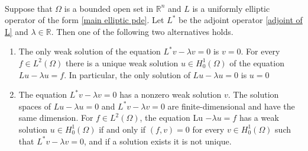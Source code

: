 \documentclass[11pt]{article}
\begin{document}
            \begin{thm}\phantom{k}\\
                Suppose that \(\Omega\) is a bounded open set in \(\mathbb{R}^{n}\) and \(L\) is a uniformly
                elliptic operator of the form \eqref{main elliptic pde}. Let \(L^{*}\) be the
                adjoint operator \eqref{adjoint of L} and \(\lambda \in \mathbb{R}\). Then one of the following two alternatives
                holds.
                \begin{enumerate}
                \item The only weak solution of the equation \(L^{*} v-\lambda v=0\) is \(v=0 .\) For every
                \(f \in L^{2}(\Omega)\) there is a unique weak solution \(u \in H_{0}^{1}(\Omega)\) of the equation
                \(L u-\lambda u=f .\) In particular, the only solution of \(L u-\lambda u=0\) is \(u=0\)
                \item The equation \(L^{*} v-\lambda v=0\) has a nonzero weak solution \(v .\) The solution
                spaces of \(L u-\lambda u=0\) and \(L^{*} v-\lambda v=0\) are finite-dimensional and have
                the same dimension. For \(f \in L^{2}(\Omega)\), the equation Lu \(-\lambda u=f\) has a
                weak solution \(u \in H_{0}^{1}(\Omega)\) if and only if \((f, v)=0\) for every \(v \in H_{0}^{1}(\Omega)\)
                such that \(L^{*} v-\lambda v=0\), and if a solution exists it is not unique.
                \end{enumerate}
            \end{thm}
\end{document}
